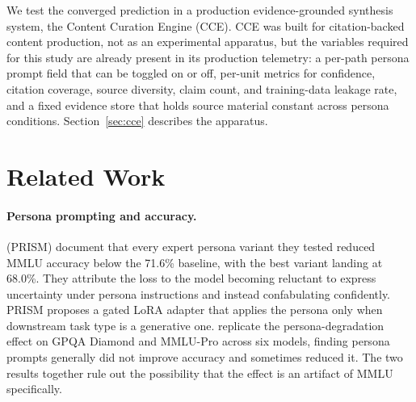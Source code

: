 \documentclass[11pt]{article}
\begin{document}
We test the converged prediction in a production
evidence-grounded synthesis system, the Content Curation Engine (CCE).
CCE was built for citation-backed content production, not as an
experimental apparatus, but the variables required for this study are
already present in its production telemetry: a per-path persona prompt
field that can be toggled on or off, per-unit metrics for confidence,
citation coverage, source diversity, claim count, and training-data
leakage rate, and a fixed evidence store that holds source material
constant across persona conditions. Section~\ref{sec:cce} describes the
apparatus.


\section{Related Work}
\label{sec:related}

\paragraph{Persona prompting and accuracy.}
\citet{hu_prism_2026} (PRISM) document that every expert persona variant
they tested reduced MMLU accuracy below the 71.6\% baseline, with the best
variant landing at 68.0\%. They attribute the loss to the model becoming
reluctant to express uncertainty under persona instructions and instead
confabulating confidently. PRISM proposes a gated LoRA adapter that
applies the persona only when downstream task type is a generative one.
\citet{basil_pretend_2025} replicate the persona-degradation effect on
GPQA Diamond and MMLU-Pro across six models, finding persona prompts
generally did not improve accuracy and sometimes reduced it. The two
results together rule out the possibility that the effect is an artifact
of MMLU specifically.
\end{document}
